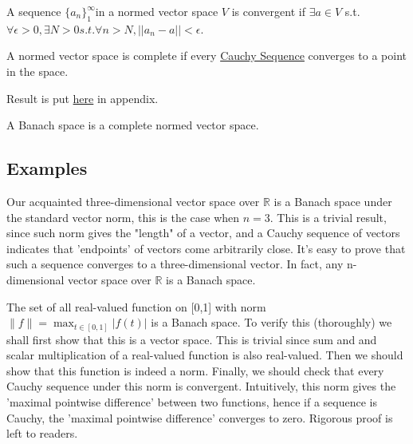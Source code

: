 \begin{definition}[Convergence]\rm\nextline
	A sequence $\{a_n\}_1^\infty$in a normed vector space $V$ is convergent if
	$\exists a\in V$ s.t.
	$\forall \epsilon>0, \exists N>0 s.t. \forall n>N, ||a_n-a||<\epsilon$.

\end{definition}

\begin{definition}[Completeness]\rm\nextline
	A normed vector space is complete if every \href{Cauchy Sequence}{Cauchy Sequence} converges to a point in the space.

\end{definition}

\begin{theorem}\rm\nextline
	Result is put \hyperref[completion of metric space]{\color {red} here} in appendix.
\end{theorem}
\begin{definition}\rm\nextline
	A Banach space is a complete normed vector space.
\end{definition}





\subsection{Examples}
\begin{example}[$\mathbb{R}^n$]\rm\nextline
	Our acquainted three-dimensional vector space over $\mathbb{R}$  is a Banach space under the standard vector norm, this is the case when $n=3$. This is a trivial result, since such norm gives the "length" of a vector, and a Cauchy sequence of vectors indicates that 'endpoints' of vectors come arbitrarily close. It's easy to prove that such a sequence converges to a three-dimensional vector. In fact, any n-dimensional  vector space over $\mathbb R$ is a Banach space.
\end{example}

\begin{example}\rm\nextline
	The set of all real-valued function on [0,1] with norm $\|f\|=\max_{t \in [0,1]} |f(t)|$
	is a Banach space. To verify this (thoroughly) we shall first show that this is a vector space. This is trivial since sum and and scalar multiplication of a real-valued function is also real-valued. Then we should show that this function is indeed a norm. Finally, we should check that every Cauchy sequence under this norm is convergent. Intuitively, this norm gives the 'maximal pointwise difference' between two functions, hence if a sequence is Cauchy, the 'maximal pointwise difference' converges to zero. Rigorous proof is left to readers.
\end{example}

